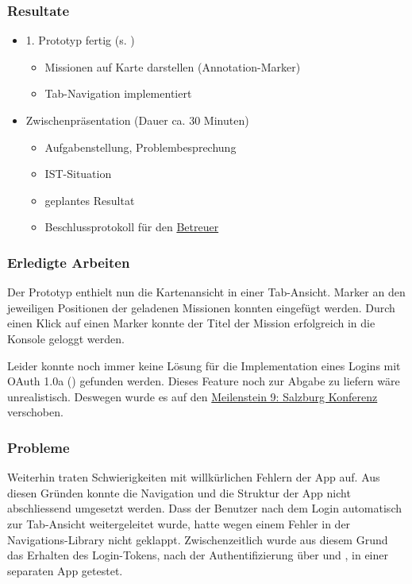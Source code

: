 \subsubsection{Resultate}
\begin{itemize}
	\item 1. Prototyp fertig (s. )
	\begin{itemize}
		\item Missionen auf Karte darstellen (Annotation-Marker)
		\item Tab-Navigation implementiert
	\end{itemize}
	\item Zwischenpräsentation (Dauer ca. 30 Minuten)
	\begin{itemize}
		\item Aufgabenstellung, Problembesprechung
		\item IST-Situation
		\item geplantes Resultat
		\item Beschlussprotokoll für den \hyperref[pm-team]{Betreuer}
	\end{itemize}
\end{itemize}

\subsubsection{Erledigte Arbeiten}
Der Prototyp enthielt nun die Kartenansicht in einer Tab-Ansicht. 
Marker an den jeweiligen Positionen der geladenen Missionen konnten eingefügt werden.
Durch einen Klick auf einen Marker konnte der Titel der Mission erfolgreich in die Konsole geloggt werden.

Leider konnte noch immer keine Lösung für die Implementation eines Logins mit \gls{OAuth} 1.0a () gefunden werden.
Dieses Feature noch zur Abgabe zu liefern wäre unrealistisch.
Deswegen wurde es auf den \hyperref[pm-ms9]{Meilenstein 9: Salzburg Konferenz} verschoben.

\subsubsection{Probleme}
Weiterhin traten Schwierigkeiten mit willkürlichen Fehlern der  App auf. 
Aus diesen Gründen konnte die Navigation und die Struktur der App nicht abschliessend umgesetzt werden.
Dass der Benutzer nach dem Login automatisch zur Tab-Ansicht weitergeleitet wurde, hatte wegen einem Fehler in der Navigations-Library nicht geklappt.
Zwischenzeitlich wurde aus diesem Grund das Erhalten des Login-Tokens, nach der Authentifizierung über  und , in einer separaten App getestet.


